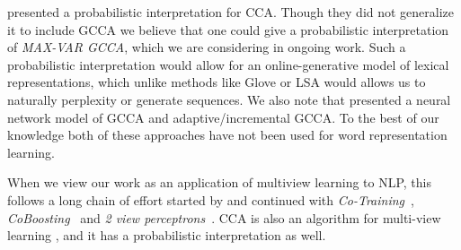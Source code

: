 \documentclass[11pt]{article}
\begin{document}
 presented a probabilistic
interpretation for CCA. Though they did not generalize it to include
GCCA we believe that one could give a probabilistic interpretation of
\emph{MAX-VAR GCCA}, which we are considering in ongoing work.  Such a
probabilistic interpretation would allow for an online-generative model of
lexical representations, which unlike methods like Glove or LSA would
allows us to naturally perplexity or generate sequences. We also note
that  presented a neural network model of GCCA
and adaptive/incremental GCCA.  To the best of our knowledge both of these approaches have not been used for word representation learning.

When we view our work as an application of multiview learning to NLP,
this follows a long chain of effort started by
 and continued with
\emph{Co-Training}~\cite{blum1998combining},
\emph{CoBoosting}~\cite{collins1999unsupervised} and \emph{2 view
  perceptrons}~\cite{brefeld2006efficient}.  CCA is also an algorithm
for multi-view learning \cite{kakade2007multi,ganchevuai08}, and it
has a probabilistic interpretation \cite{bach2005probabilistic} as
well.
\end{document}
